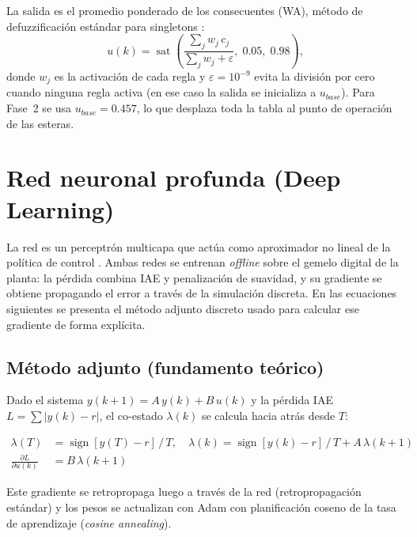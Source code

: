 La salida es el promedio ponderado de los consecuentes (WA), método de defuzzificación estándar para singletons \cite[cap.~5]{passino2005biomimicry}:
\[
u(k) = \operatorname{sat}\!\left(\frac{\sum_j w_j\,c_j}{\sum_j w_j + \varepsilon},\;0.05,\;0.98\right),
\]
donde $w_j$ es la activación de cada regla y $\varepsilon=10^{-9}$ evita la división por cero cuando ninguna regla activa (en ese caso la salida se inicializa a $u_{base}$). Para Fase~2 se usa $u_{base}=0.457$, lo que desplaza toda la tabla al punto de operación de las esteras.

\section{Red neuronal profunda (Deep Learning)}

La red es un perceptrón multicapa que actúa como aproximador no lineal de la política de control \cite[cap.~4]{passino2005biomimicry}. Ambas redes se entrenan \emph{offline} sobre el gemelo digital de la planta: la pérdida combina IAE y penalización de suavidad, y su gradiente se obtiene propagando el error a través de la simulación discreta. En las ecuaciones siguientes se presenta el método adjunto discreto usado para calcular ese gradiente de forma explícita.

\subsection*{Método adjunto (fundamento teórico)}

Dado el sistema $y(k+1)=A\,y(k)+B\,u(k)$ y la pérdida IAE $L=\sum|y(k)-r|$, el co-estado $\lambda(k)$ se calcula hacia atrás desde $T$:

\begin{align}
\lambda(T) &= \operatorname{sign}\!\left[y(T)-r\right]\,/\,T, \quad
\lambda(k) = \operatorname{sign}\!\left[y(k)-r\right]\,/\,T + A\,\lambda(k+1) \label{eq:adjoint}\\
\frac{\partial L}{\partial u(k)} &= B\,\lambda(k+1) \label{eq:grad_u}
\end{align}

Este gradiente se retropropaga luego a través de la red (retropropagación estándar) y los pesos se actualizan con Adam con planificación coseno de la tasa de aprendizaje (\emph{cosine annealing}).

